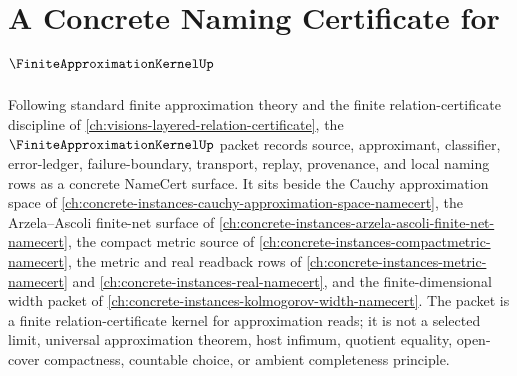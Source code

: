 \chapter{A Concrete Naming Certificate for $\FiniteApproximationKernelUp$}
\label{ch:concrete-instances-finite-approximation-kernel-namecert}

Following standard finite approximation theory and the finite relation-certificate discipline of \autoref{ch:visions-layered-relation-certificate}, the $\FiniteApproximationKernelUp$ packet records source, approximant, classifier, error-ledger, failure-boundary, transport, replay, provenance, and local naming rows as a concrete NameCert surface. It sits beside the Cauchy approximation space of \autoref{ch:concrete-instances-cauchy-approximation-space-namecert}, the Arzela--Ascoli finite-net surface of \autoref{ch:concrete-instances-arzela-ascoli-finite-net-namecert}, the compact metric source of \autoref{ch:concrete-instances-compactmetric-namecert}, the metric and real readback rows of \autoref{ch:concrete-instances-metric-namecert} and \autoref{ch:concrete-instances-real-namecert}, and the finite-dimensional width packet of \autoref{ch:concrete-instances-kolmogorov-width-namecert}. The packet is a finite relation-certificate kernel for approximation reads; it is not a selected limit, universal approximation theorem, host infimum, quotient equality, open-cover compactness, countable choice, or ambient completeness principle.

